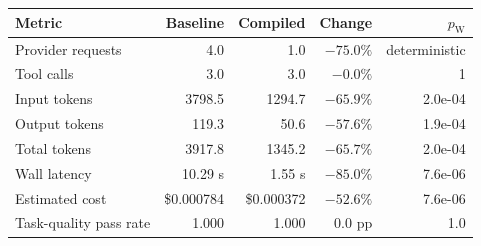\begin{tabular}{lrrrr}
\toprule
Metric & Baseline & Compiled & Change & $p_{\mathrm{W}}$ \\
\midrule
Provider requests & 4.0 & 1.0 & $-75.0\%$ & deterministic \\
Tool calls & 3.0 & 3.0 & $-0.0\%$ & 1 \\
Input tokens & 3798.5 & 1294.7 & $-65.9\%$ & 2.0e-04 \\
Output tokens & 119.3 & 50.6 & $-57.6\%$ & 1.9e-04 \\
Total tokens & 3917.8 & 1345.2 & $-65.7\%$ & 2.0e-04 \\
Wall latency & 10.29 s & 1.55 s & $-85.0\%$ & 7.6e-06 \\
Estimated cost & \$0.000784 & \$0.000372 & $-52.6\%$ & 7.6e-06 \\
\midrule
Task-quality pass rate & 1.000 & 1.000 & 0.0 pp & 1.0 \\
\bottomrule
\end{tabular}
